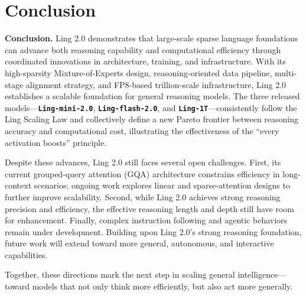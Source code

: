 

\section{Conclusion}

\textbf{Conclusion.} 
Ling 2.0 demonstrates that large-scale sparse language foundations can advance both reasoning capability and computational efficiency through coordinated innovations in architecture, training, and infrastructure. With its high-sparsity Mixture-of-Experts design, reasoning-oriented data pipeline, multi-stage alignment strategy, and FP8-based trillion-scale infrastructure, Ling 2.0 establishes a scalable foundation for general reasoning models. The three released models—\textbf{\texttt{Ling-mini-2.0}}, \textbf{\texttt{Ling-flash-2.0}}, and \textbf{\texttt{Ling-1T}}—consistently follow the Ling Scaling Law and collectively define a new Pareto frontier between reasoning accuracy and computational cost, illustrating the effectiveness of the ``every activation boosts'' principle.  

Despite these advances, Ling 2.0 still faces several open challenges. 
First, its current grouped-query attention (GQA) architecture constrains efficiency in long-context scenarios; ongoing work explores linear and sparse-attention designs to further improve scalability. 
Second, while Ling 2.0 achieves strong reasoning precision and efficiency, the effective reasoning length and depth still have room for enhancement. 
Finally, complex instruction following and agentic behaviors remain under development. Building upon Ling 2.0's strong reasoning foundation, future work will extend toward more general, autonomous, and interactive capabilities.  

Together, these directions mark the next step in scaling general intelligence---toward models that not only think more efficiently, but also act more generally.

